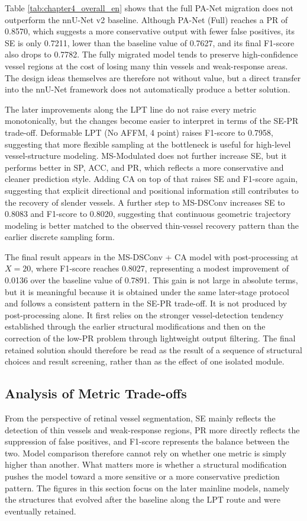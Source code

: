 \documentclass[a4paper,11pt]{article}
\begin{document}
Table \ref{tab:chapter4_overall_en} shows that the full PA-Net migration does not outperform the nnU-Net v2 baseline. Although PA-Net (Full) reaches a PR of 0.8570, which suggests a more conservative output with fewer false positives, its SE is only 0.7211, lower than the baseline value of 0.7627, and its final F1-score also drops to 0.7782. The fully migrated model tends to preserve high-confidence vessel regions at the cost of losing many thin vessels and weak-response areas. The design ideas themselves are therefore not without value, but a direct transfer into the nnU-Net framework does not automatically produce a better solution.

The later improvements along the LPT line do not raise every metric monotonically, but the changes become easier to interpret in terms of the SE-PR trade-off. Deformable LPT (No AFFM, 4 point) raises F1-score to 0.7958, suggesting that more flexible sampling at the bottleneck is useful for high-level vessel-structure modeling. MS-Modulated does not further increase SE, but it performs better in SP, ACC, and PR, which reflects a more conservative and cleaner prediction style. Adding CA on top of that raises SE and F1-score again, suggesting that explicit directional and positional information still contributes to the recovery of slender vessels. A further step to MS-DSConv increases SE to 0.8083 and F1-score to 0.8020, suggesting that continuous geometric trajectory modeling is better matched to the observed thin-vessel recovery pattern than the earlier discrete sampling form.

The final result appears in the MS-DSConv + CA model with post-processing at \(X=20\), where F1-score reaches 0.8027, representing a modest improvement of 0.0136 over the baseline value of 0.7891. This gain is not large in absolute terms, but it is meaningful because it is obtained under the same later-stage protocol and follows a consistent pattern in the SE-PR trade-off. It is not produced by post-processing alone. It first relies on the stronger vessel-detection tendency established through the earlier structural modifications and then on the correction of the low-PR problem through lightweight output filtering. The final retained solution should therefore be read as the result of a sequence of structural choices and result screening, rather than as the effect of one isolated module.

\subsection{Analysis of Metric Trade-offs}
From the perspective of retinal vessel segmentation, SE mainly reflects the detection of thin vessels and weak-response regions, PR more directly reflects the suppression of false positives, and F1-score represents the balance between the two. Model comparison therefore cannot rely on whether one metric is simply higher than another. What matters more is whether a structural modification pushes the model toward a more sensitive or a more conservative prediction pattern. The figures in this section focus on the later mainline models, namely the structures that evolved after the baseline along the LPT route and were eventually retained.
\end{document}
